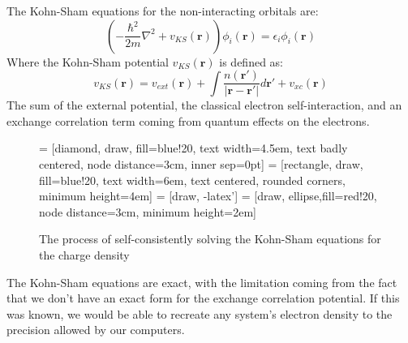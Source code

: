 \documentclass[12pt]{article}
\begin{document}
The Kohn-Sham equations for the non-interacting orbitals are:
\begin{equation}\label{eq:kohn-sham}
\left(-\frac{\hbar^2}{2m}\nabla^2 + v_{KS}(\mathbf r)\right)\phi_i(\mathbf r) = \epsilon_i \phi_i(\mathbf r)
\end{equation}
Where the Kohn-Sham potential $v_{KS}(\mathbf r)$ is defined as:
\begin{equation}\label{eq:kohn-shampotential}
v_{KS}(\mathbf r) = v_{ext}(\mathbf r) + \int \frac{n(\mathbf r')}{\left|\mathbf r - \mathbf {r'}\right|}d\mathbf {r'} + v_{xc}(\mathbf r)
\end{equation}
The sum of the external potential, the classical electron self-interaction, and an exchange correlation term coming from quantum effects on the electrons. 
\begin{figure}
\centering
	 = [diamond, draw, fill=blue!20, 
    text width=4.5em, text badly centered, node distance=3cm, inner sep=0pt]
 = [rectangle, draw, fill=blue!20, 
    text width=6em, text centered, rounded corners, minimum height=4em]
 = [draw, -latex']
 = [draw, ellipse,fill=red!20, node distance=3cm,
    minimum height=2em]
    
\caption{The process of self-consistently solving the Kohn-Sham equations for the charge density}
\end{figure}

The Kohn-Sham equations are exact, with the limitation coming from the fact that we don't have an exact form for the exchange correlation potential. If this was known, we would be able to recreate any system's electron density to the precision allowed by our computers.
\end{document}

